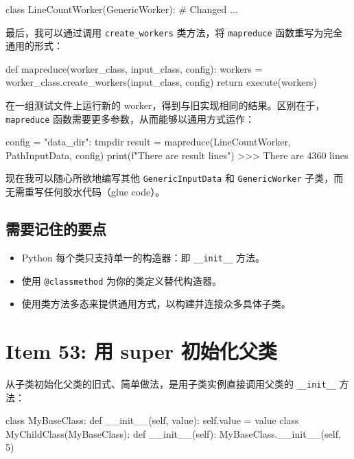 \begin{codebox}[python]
class LineCountWorker(GenericWorker):  # Changed
    ...
\end{codebox}

最后，我可以通过调用 \texttt{create\_workers} 类方法，将 \texttt{mapreduce} 函数重写为完全通用的形式：

\begin{codebox}[python]
def mapreduce(worker_class, input_class, config):
    workers = worker_class.create_workers(input_class, config)
    return execute(workers)
\end{codebox}

在一组测试文件上运行新的 worker，得到与旧实现相同的结果。区别在于，\texttt{mapreduce} 函数需要更多参数，从而能够以通用方式运作：

\begin{codebox}[python]
config = {"data_dir": tmpdir}
result = mapreduce(LineCountWorker, PathInputData, config)
print(f"There are {result} lines")
>>>
There are 4360 lines
\end{codebox}

现在我可以随心所欲地编写其他 \texttt{GenericInputData} 和 \texttt{GenericWorker} 子类，而无需重写任何胶水代码（glue code）。

\subsection{需要记住的要点}

\begin{itemize}
\item Python 每个类只支持单一的构造器：即 \texttt{\_\_init\_\_} 方法。
\item 使用 \texttt{@classmethod} 为你的类定义替代构造器。
\item 使用类方法多态来提供通用方式，以构建并连接众多具体子类。
\end{itemize}

\section{Item 53: 用 super 初始化父类}

从子类初始化父类的旧式、简单做法，是用子类实例直接调用父类的 \texttt{\_\_init\_\_} 方法：

\begin{codebox}[python]
class MyBaseClass:
    def __init__(self, value):
        self.value = value
class MyChildClass(MyBaseClass):
    def __init__(self):
        MyBaseClass.__init__(self, 5)
\end{codebox}

